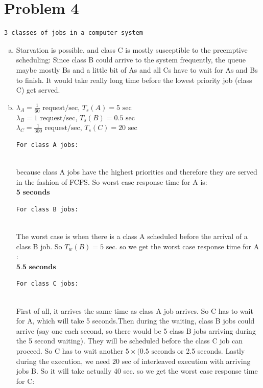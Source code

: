 \documentclass{article}   	                         %
\begin{document}
\section*{Problem 4}
\begin{BVerbatim}
3 classes of jobs in a computer system
\end{BVerbatim}
\begin{enumerate}[(a)]
\item
Starvation is possible, and class C is mostly susceptible to the preemptive scheduling: Since class B could arrive to the system frequently, the queue maybe mostly Bs and a little bit of As and all Cs have to wait for As and Bs to finish. It would take really long time before the lowest priority job (class C) get served. 
\item
$\lambda_A = \frac{1}{60} \text {  request/sec}$, $T_s (A) = 5 \text {  sec}$\\
$\lambda_B = 1 \text {  request/sec}$, $T_s (B) = 0.5 \text {  sec} $\\
$\lambda_C = \frac{1}{300} \text{  request/sec}$, $T_s (C) = 20 \text {  sec}$\\
\begin{BVerbatim}
For class A jobs:
\end{BVerbatim}
\\
because class A jobs have the highest priorities and therefore they are served in the fashion of FCFS. So worst case response time for A is: \\
$\textbf {5 seconds}$\\
\begin{BVerbatim}
For class B jobs:
\end{BVerbatim}
\\The worst case is when there is a class A scheduled before the arrival of a class B job. So $T_w(B) = 5 \text {  sec}$. so we get the worst case response time for A :\\
$\textbf {5.5 seconds}$\\
\begin{BVerbatim}
For class C jobs:
\end{BVerbatim}
\\
First of all, it arrives the same time as class A job arrives. So C has to wait for A, which will take 5 seconds.Then during the waiting, class B jobs could arrive (say one each second, so there would be 5 class B jobs arriving during the 5 second waiting). They will be scheduled before the class C job can proceed. So C has to wait another $5\times (0.5 \text {  seconds}$ or 2.5 seconds. Lastly during the execution, we need 20 sec of interleaved execution with arriving jobs B. So it will take actually 40 sec. so we get the worst case response time for C:\\

\end{enumerate}
\end{document}
